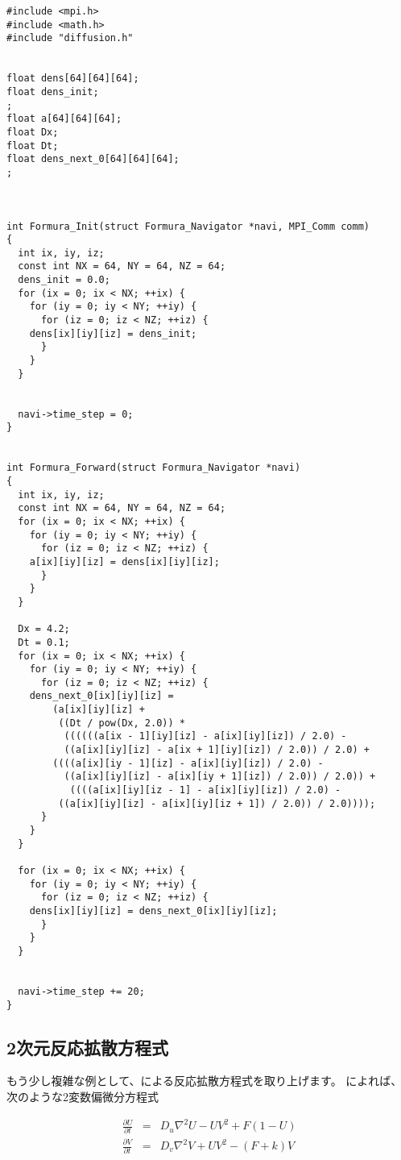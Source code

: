 \documentclass{jsarticle}
\begin{document}
\begin{breakbox}
\begin{verbatim}
#include <mpi.h>
#include <math.h>
#include "diffusion.h"


float dens[64][64][64];
float dens_init;
;
float a[64][64][64];
float Dx;
float Dt;
float dens_next_0[64][64][64];
;



int Formura_Init(struct Formura_Navigator *navi, MPI_Comm comm)
{
  int ix, iy, iz;
  const int NX = 64, NY = 64, NZ = 64;
  dens_init = 0.0;
  for (ix = 0; ix < NX; ++ix) {
    for (iy = 0; iy < NY; ++iy) {
      for (iz = 0; iz < NZ; ++iz) {
	dens[ix][iy][iz] = dens_init;
      }
    }
  }


  navi->time_step = 0;
}


int Formura_Forward(struct Formura_Navigator *navi)
{
  int ix, iy, iz;
  const int NX = 64, NY = 64, NZ = 64;
  for (ix = 0; ix < NX; ++ix) {
    for (iy = 0; iy < NY; ++iy) {
      for (iz = 0; iz < NZ; ++iz) {
	a[ix][iy][iz] = dens[ix][iy][iz];
      }
    }
  }

  Dx = 4.2;
  Dt = 0.1;
  for (ix = 0; ix < NX; ++ix) {
    for (iy = 0; iy < NY; ++iy) {
      for (iz = 0; iz < NZ; ++iz) {
	dens_next_0[ix][iy][iz] =
	    (a[ix][iy][iz] +
	     ((Dt / pow(Dx, 2.0)) *
	      ((((((a[ix - 1][iy][iz] - a[ix][iy][iz]) / 2.0) -
		  ((a[ix][iy][iz] - a[ix + 1][iy][iz]) / 2.0)) / 2.0) +
		((((a[ix][iy - 1][iz] - a[ix][iy][iz]) / 2.0) -
		  ((a[ix][iy][iz] - a[ix][iy + 1][iz]) / 2.0)) / 2.0)) +
	       ((((a[ix][iy][iz - 1] - a[ix][iy][iz]) / 2.0) -
		 ((a[ix][iy][iz] - a[ix][iy][iz + 1]) / 2.0)) / 2.0))));
      }
    }
  }

  for (ix = 0; ix < NX; ++ix) {
    for (iy = 0; iy < NY; ++iy) {
      for (iz = 0; iz < NZ; ++iz) {
	dens[ix][iy][iz] = dens_next_0[ix][iy][iz];
      }
    }
  }


  navi->time_step += 20;
}
\end{verbatim}
\end{breakbox}


\subsection{2次元反応拡散方程式}

もう少し複雑な例として、\citet{pearson1993complex}による反応拡散方程式を取り上げます。
\citet{pearson1993complex}によれば、次のような2変数偏微分方程式

\begin{eqnarray}
  \frac{\partial U}{\partial t} &=& D_u \nabla^2 U - UV^2 + F(1-U)\\
  \frac{\partial V}{\partial t} &=& D_v \nabla^2 V + UV^2 - (F+k)V
\end{eqnarray}
\end{document}
